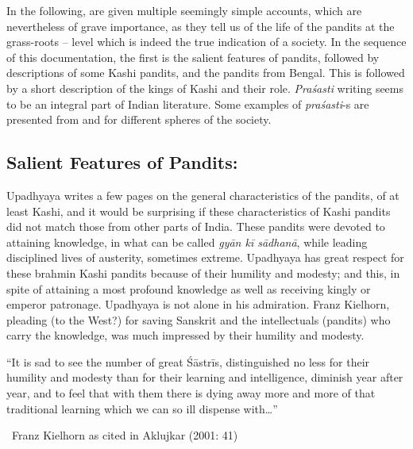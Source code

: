 In the following, are given multiple seemingly simple accounts, which are nevertheless of grave importance, as they tell us of the life of the pandits at the grass-roots – level which is indeed the true indication of a society. In the sequence of this documentation, the first is the salient features of pandits, followed by descriptions of some Kashi pandits, and the pandits from Bengal. This is followed by a short description of the kings of Kashi and their role. \textit{Praśasti} writing seems to be an integral part of Indian literature. Some examples of \textit{praśasti}-s are presented from and for different spheres of the society.


\subsection*{Salient Features of Pandits:}

Upadhyaya writes a few pages on the general characteristics of the pandits, of at least Kashi, and it would be surprising if these characteristics of Kashi pandits did not match those from other parts of India. These pandits were devoted to attaining knowledge, in what can be called \textit{gyān kī sādhanā}, while leading disciplined lives of austerity, sometimes extreme. Upadhyaya has great respect for these brahmin Kashi pandits because of their humility and modesty; and this, in spite of attaining a most profound knowledge as well as receiving kingly or emperor patronage. Upadhyaya is not alone in his admiration. Franz Kielhorn, pleading (to the West?) for saving Sanskrit and the intellectuals (pandits) who carry the knowledge, was much impressed by their humility and modesty.

\begin{myquote}
“It is sad to see the number of great Śāstrīs, distinguished no less for their humility and modesty than for their learning and intelligence, diminish year after year, and to feel that with them there is dying away more and more of that traditional learning which we can so ill dispense with…” 

~\hfill Franz Kielhorn as cited in Aklujkar (2001: 41)
\end{myquote}


